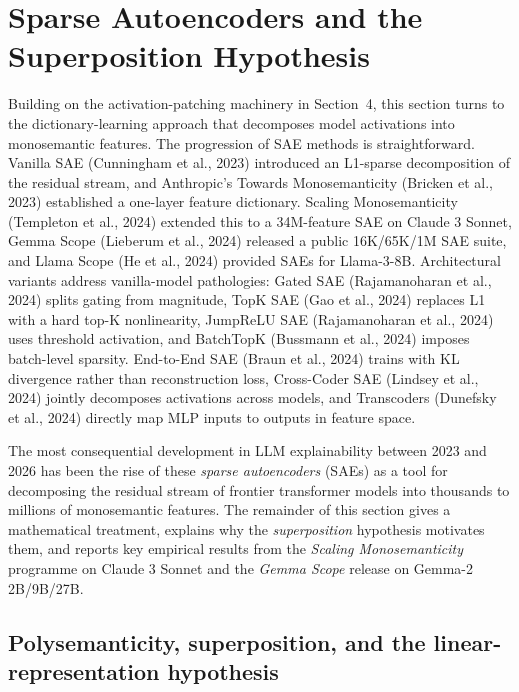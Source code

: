 \section{Sparse Autoencoders and the Superposition Hypothesis}\label{sparse-autoencoders-and-the-superposition-hypothesis}

Building on the activation-patching machinery in Section~4, this section turns to the dictionary-learning approach that decomposes model activations into monosemantic features. The progression of SAE methods is straightforward. Vanilla SAE (Cunningham et al., 2023) introduced an L1-sparse decomposition of the residual stream, and Anthropic's Towards Monosemanticity (Bricken et al., 2023) established a one-layer feature dictionary. Scaling Monosemanticity (Templeton et al., 2024) extended this to a 34M-feature SAE on Claude 3 Sonnet, Gemma Scope (Lieberum et al., 2024) released a public 16K/65K/1M SAE suite, and Llama Scope (He et al., 2024) provided SAEs for Llama-3-8B. Architectural variants address vanilla-model pathologies: Gated SAE (Rajamanoharan et al., 2024) splits gating from magnitude, TopK SAE (Gao et al., 2024) replaces L1 with a hard top-K nonlinearity, JumpReLU SAE (Rajamanoharan et al., 2024) uses threshold activation, and BatchTopK (Bussmann et al., 2024) imposes batch-level sparsity. End-to-End SAE (Braun et al., 2024) trains with KL divergence rather than reconstruction loss, Cross-Coder SAE (Lindsey et al., 2024) jointly decomposes activations across models, and Transcoders (Dunefsky et al., 2024) directly map MLP inputs to outputs in feature space.

The most consequential development in LLM explainability between 2023 and 2026 has been the rise of these \emph{sparse autoencoders} (SAEs) as a tool for decomposing the residual stream of frontier transformer models into thousands to millions of monosemantic features. The remainder of this section gives a mathematical treatment, explains why the \emph{superposition} hypothesis motivates them, and reports key empirical results from the \emph{Scaling Monosemanticity} programme on Claude 3 Sonnet and the \emph{Gemma Scope} release on Gemma-2 2B/9B/27B.

\subsection{Polysemanticity, superposition, and the linear-representation hypothesis}\label{polysemanticity-superposition-and-the-linear-representation-hypothesis}

